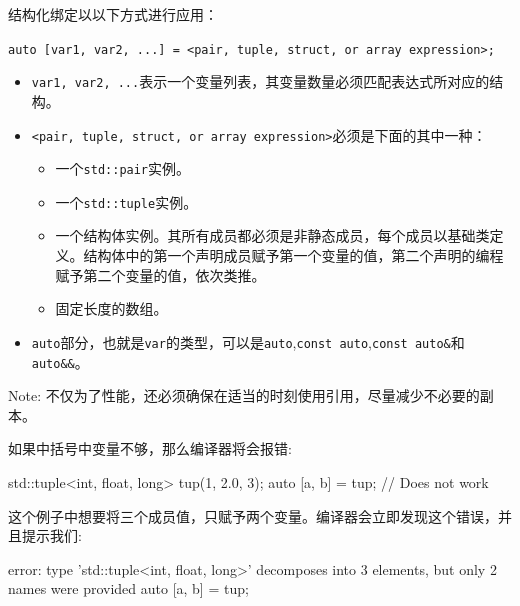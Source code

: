 
结构化绑定以以下方式进行应用：

\texttt{auto [var1, var2, ...] = <pair, tuple, struct, or array expression>;}

\begin{itemize}
\item \texttt{var1, var2, ...}表示一个变量列表，其变量数量必须匹配表达式所对应的结构。

\item \texttt{<pair, tuple, struct, or array expression>}必须是下面的其中一种：

\begin{itemize}
\item 一个\texttt{std::pair}实例。

\item 一个\texttt{std::tuple}实例。

\item 一个结构体实例。其所有成员都必须是非静态成员，每个成员以基础类定义。结构体中的第一个声明成员赋予第一个变量的值，第二个声明的编程赋予第二个变量的值，依次类推。

\item 固定长度的数组。

\end{itemize}

\item \texttt{auto}部分，也就是\texttt{var}的类型，可以是\texttt{auto},\texttt{const auto},\texttt{const auto\&}和\texttt{auto\&\&}。

\end{itemize}

\begin{myInfoBox}
Note: 不仅为了性能，还必须确保在适当的时刻使用引用，尽量减少不必要的副本。
\end{myInfoBox}

如果中括号中变量不够，那么编译器将会报错:

\begin{codebox}[cpp]
std::tuple<int, float, long> tup(1, 2.0, 3);
auto [a, b] = tup; // Does not work
\end{codebox}

这个例子中想要将三个成员值，只赋予两个变量。编译器会立即发现这个错误，并且提示我们:

\begin{codebox}[text]
error: type 'std::tuple<int, float, long>' decomposes into 3 elements, but only 2 names were provided
auto [a, b] = tup;
\end{codebox}

